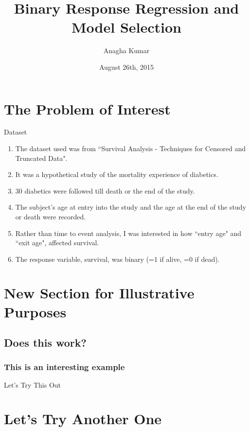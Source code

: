 \documentclass{medstarbeamer}
\title[ Applied Bayesian Data Analysis]{Binary Response Regression and Model Selection}
\institute[]{}
\author[ Anagha Kumar]{Anagha Kumar}
\date{August 26th, 2015}
\begin{document}
\begin{frame} 
\maketitle
\end{frame}


\section{The Problem of Interest}
\begin{frame}{Dataset}
\begin{enumerate}
\item{The dataset used was from ``Survival Analysis - Techniques for Censored and Truncated Data".} 
\item{It was a hypothetical study of the mortality experience of diabetics.}
\item{30 diabetics were followed till death or the end of the study.}
\item{The subject's age at entry into the study and the age at the end of the study or death were recorded.}
\item{Rather than time to event analysis, I was interested in how ``entry age" and ``exit age", affected survival.} 
\item{\alert{The response variable, survival, was binary (=1 if alive, =0 if dead).}}
\end{enumerate}
\end{frame}

\section{New Section for Illustrative Purposes}
\subsection{Does this work?}
\subsubsection{This is an interesting example}
\begin{frame}{Let's Try This Out}
\end{frame}

\section{Let's Try Another One}
\end{document}
